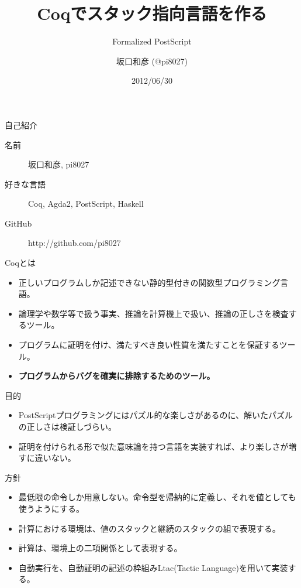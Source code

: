 \documentclass[cjk, 14pt, dvipdfm]{beamer}
\title{Coqでスタック指向言語を作る}
\subtitle{Formalized PostScript}
\author{坂口和彦 (@pi8027)}
\institute{筑波大学 情報学群 情報科学類 B2}
\date{2012/06/30}
\begin{document}
\begin{frame}[plain]

 \maketitle

\end{frame}

\begin{frame}{自己紹介}

  \begin{description}
    \item [名前] 坂口和彦, pi8027
    \item [好きな言語] Coq, Agda2, PostScript, Haskell
    \item [GitHub] http://github.com/pi8027
  \end{description}

\end{frame}

\begin{frame}{Coqとは}

  \begin{itemize}
    \item 正しいプログラムしか記述できない静的型付きの関数型プログラミング言語。
    \item 論理学や数学等で扱う事実、推論を計算機上で扱い、推論の正しさを検査するツール。
    \item プログラムに証明を付け、満たすべき良い性質を満たすことを保証するツール。
    \item \textbf{プログラムからバグを確実に排除するためのツール。}
  \end{itemize}

\end{frame}

\begin{frame}{目的}

  \begin{itemize}
    \item PostScriptプログラミングにはパズル的な楽しさがあるのに、解いたパズルの正しさは検証しづらい。
    \item 証明を付けられる形で似た意味論を持つ言語を実装すれば、より楽しさが増すに違いない。
  \end{itemize}

\end{frame}

\begin{frame}{方針}

  \begin{itemize}
    \item 最低限の命令しか用意しない。命令型を帰納的に定義し、それを値としても使うようにする。
    \item 計算における環境は、値のスタックと継続のスタックの組で表現する。
    \item 計算は、環境上の二項関係として表現する。
    \item 自動実行を、自動証明の記述の枠組みLtac(Tactic Language)を用いて実装する。
  \end{itemize}

\end{frame}
\end{document}
